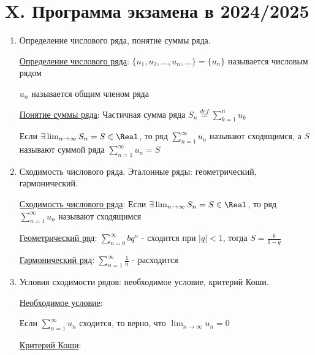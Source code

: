 \clearpage

\section{X. Программа экзамена в 2024/2025}


\begin{enumerate}
\subsection{X.1. Числовые ряды.}

    \item Определение числового ряда, понятие суммы ряда.

    \hyperlink{numberseriesdefinition}{Определение числового ряда}: $\{u_1, u_2, \dots, u_n, \dots\} = \{u_n\}$ называется числовым рядом

    $u_n$ называется общим членом ряда
    
    \hyperlink{sumofseriesdefinition}{Понятие суммы ряда}: Частичная сумма ряда $S_n \stackrel{def}{=} \sum_{k = 1}^{n} u_k$

    Если $\exists \lim_{n \to\infty} S_n = S \in \Real$, то ряд $\sum_{n = 1}^\infty u_n$ называют сходящимся,
    а $S$ называют суммой ряда $\sum_{n = 1}^\infty u_n = S$

    \item Сходимость числового ряда. Эталонные ряды: геометрический, гармонический.

    \hyperlink{seriesconvergence}{Сходимость числового ряда}: Если $\exists \lim_{n \to\infty} S_n = S \in \Real$, то ряд $\sum_{n = 1}^\infty u_n$ называют сходящимся

    \hyperlink{geometricseries}{Геометрический ряд}: $\sum_{n = 0}^\infty b q^n$ - сходится при $|q| < 1$, тогда $S = \frac{b}{1 - q}$
    
    \hyperlink{harmonicseries}{Гармонический ряд}: $\sum_{n = 1}^\infty \frac{1}{n}$ - расходится

    \item Условия сходимости рядов: необходимое условие, критерий Коши.

    \hyperlink{necessarycondition}{Необходимое условие}: 

    \begin{MyTheorem}
        \Ths Если $\sum_{n = 1}^\infty u_n$ сходится, то верно, что $\lim_{n \to \infty} u_n = 0$
    \end{MyTheorem}

    \hyperlink{cauchycriteria}{Критерий Коши}:


\end{enumerate}
